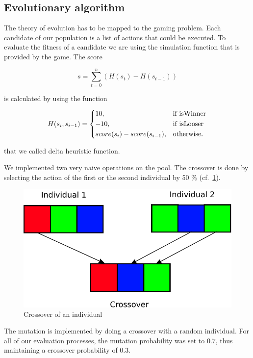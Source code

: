 \subsection{Evolutionary algorithm} 

The theory of evolution has to be mapped to the gaming problem. Each candidate of our population is
a list of actions that could be executed. To evaluate the fitness of a candidate we are using the
simulation function that is provided by the game. 
The score

\begin{equation}
s = \sum_{t=0}^n (H(s_t) - H(s_{t-1}))
\end{equation}

is calculated by using the function

\begin{equation}
    H(s_i, s_{i-1}) = 
\begin{dcases}
    10, & \text{if isWinner}  \\
    -10, & \text{if isLooser}  \\
    score(s_i) - score(s_{i-1}), & \text{otherwise.}
\end{dcases}
\end{equation}

that we called delta heuristic function.

We implemented two very naive operations on the pool. The crossover is done by selecting the action of the first or the second individual by 50 \% (cf.~\cref{fig:crossover}).

\begin{figure}[H]
\centering
\includegraphics[scale=0.6]{images/crossover.pdf}
\caption{Crossover of an individual}
\label{fig:crossover}
\end{figure}

The mutation is implemented by doing a crossover with a random individual.
For all of our evaluation processes, the mutation probability was set to $0.7$, thus maintaining a crossover probability of $0.3$.

